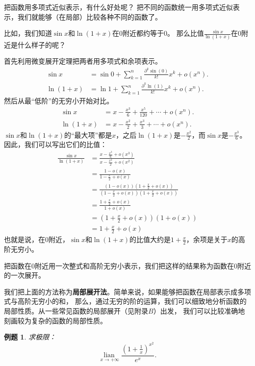 \documentclass[12pt,UTF8]{ctexbook}
\newcommand{\lian}[1]{
    \underset{#1}{\operatorname{lian}\,}
}
\newcommand{\olim}[1]{\mathit{o}\left(#1\right)}  %
\newtheorem{et}{例题}[section]
\begin{document}
把函数用多项式近似表示，有什么好处呢？
把不同的函数统一用多项式近似表示，我们就能够（在局部）比较各种不同的函数了。

比如，我们知道$\sin{x}$和$\ln{(1+x)}$在$0$附近都约等于$0$。
那么比值$\frac{\sin{x}}{\ln{(1 + x)}}$在$0$附近是什么样子的呢？

首先利用微变展开定理把两者用多项式和余项表示。
\begin{align*}
    \sin{x} &= \sin{0} + \sum_{k=1}^n \frac{\partial^k \sin (0)}{k!}x^k + \mathit{o}(x^n).  \\
    \ln{(1 + x)} &= \ln{1} + \sum_{k=1}^n \frac{\partial^k \ln (1)}{k!}x^k + \mathit{o}(x^n).  
\end{align*}
然后从最“低阶”的无穷小开始对比。
\begin{align*}
    \sin{x} &= x - \frac{x^3}{6} + \frac{x^5}{120} + \cdots + \mathit{o}(x^n).  \\
    \ln{(1 + x)} &= x - \frac{x^2}{2} + \frac{x^3}{3} + \cdots + \mathit{o}(x^n). 
\end{align*}
$\sin{x}$和$\ln{(1+x)}$的“最大项”都是$x$，之后$\ln{(1+x)}$是$- \frac{x^2}{2}$，而$\sin{x}$是$- \frac{x^3}{6}$。
因此，我们可以写出它们的比值：
\begin{align*}
    \frac{\sin{x}}{\ln{(1 + x)}} &= \frac{x - \frac{x^3}{6} + \olim{x^3}}{x - \frac{x^2}{2} + \olim{x^2}}  \\
    &= \frac{1 - \olim{x}}{1 - \frac{x}{2} + \olim{x}}  \\
    &= \frac{(1 - \olim{x})\left(1 + \frac{x}{2} + \olim{x}\right)}{\left(1 - \frac{x}{2} + \olim{x}\right)\left(1 + \frac{x}{2} + \olim{x}\right)}  \\
    &= \frac{1 + \frac{x}{2} + \olim{x}}{1 + \olim{x}}  \\
    &= \left(1 + \frac{x}{2} + \olim{x}\right)(1 + \olim{x})  \\
    &= 1 + \frac{x}{2} + \olim{x} 
\end{align*}
也就是说，在$0$附近，$\sin{x}$和$\ln{(1+x)}$的比值大约是$1 + \frac{x}{2}$，余项是关于$x$的高阶无穷小。

把函数在$0$附近用一次整式和高阶无穷小表示，我们把这样的结果称为函数在$0$附近的一次展开。

我们把上面的方法称为\textbf{局部展开法}。简单来说，如果能够把函数在局部表示成多项式与高阶无穷小的和，
那么，通过无穷的阶的运算，我们可以细致地分析函数的局部性质。从一些常见函数的局部展开（见附录$B$）出发，
我们可以比较准确地刻画较为复杂的函数的局部性质。

\begin{et}
    求极限：
    $$ \lian{x\to +\infty} \frac{\left(1 + \frac{1}{x}\right)^{x^2}}{e^x}.$$
\end{et}
\end{document}
